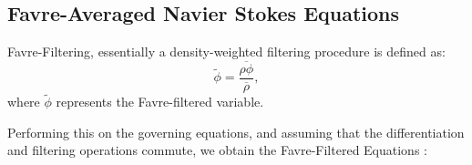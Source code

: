 \subsection{Favre-Averaged Navier Stokes Equations} \label{section:Favre}
Favre-Filtering, essentially a density-weighted filtering procedure is defined as:
\begin{equation}
 \tilde{\phi}=\frac{\overline{\rho \phi}}{\overline{\rho}},
 \end{equation}
where $\tilde{\phi}$ represents the Favre-filtered variable.

Performing this on the governing equations, and assuming that the differentiation and filtering operations commute, we obtain the Favre-Filtered Equations \cite{HPerez:2011}:\par

